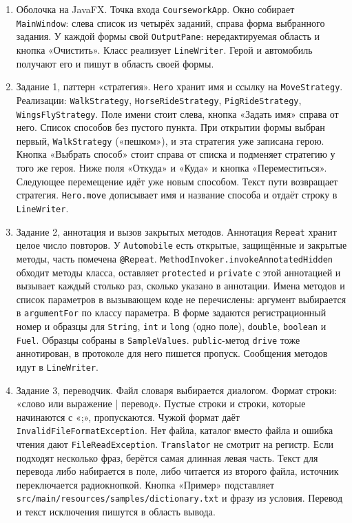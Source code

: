 \documentclass[a4paper,14pt]{extarticle}
\begin{document}
\begin{enumerate}
    \item Оболочка на JavaFX. Точка входа \texttt{CourseworkApp}. Окно собирает \texttt{MainWindow}: слева список из четырёх заданий, справа форма выбранного задания. У каждой формы свой \texttt{OutputPane}: нередактируемая область и кнопка «Очистить». Класс реализует \texttt{LineWriter}. Герой и автомобиль получают его и пишут в область своей формы.

    \item Задание 1, паттерн «стратегия». \texttt{Hero} хранит имя и ссылку на \texttt{MoveStrategy}. Реализации: \texttt{WalkStrategy}, \texttt{HorseRideStrategy}, \texttt{PigRideStrategy}, \texttt{WingsFlyStrategy}. Поле имени стоит слева, кнопка «Задать имя» справа от него. Список способов без пустого пункта. При открытии формы выбран первый, \texttt{WalkStrategy} («пешком»), и эта стратегия уже записана герою. Кнопка «Выбрать способ» стоит справа от списка и подменяет стратегию у того же героя. Ниже поля «Откуда» и «Куда» и кнопка «Переместиться». Следующее перемещение идёт уже новым способом. Текст пути возвращает стратегия. \texttt{Hero.move} дописывает имя и название способа и отдаёт строку в \texttt{LineWriter}.

    \item Задание 2, аннотация и вызов закрытых методов. Аннотация \texttt{Repeat} хранит целое число повторов. У \texttt{Automobile} есть открытые, защищённые и закрытые методы, часть помечена \texttt{@Repeat}. \texttt{MethodInvoker.invokeAnnotatedHidden} обходит методы класса, оставляет \texttt{protected} и \texttt{private} с этой аннотацией и вызывает каждый столько раз, сколько указано в аннотации. Имена методов и список параметров в вызывающем коде не перечислены: аргумент выбирается в \texttt{argumentFor} по классу параметра. В форме задаются регистрационный номер и образцы для \texttt{String}, \texttt{int} и \texttt{long} (одно поле), \texttt{double}, \texttt{boolean} и \texttt{Fuel}. Образцы собраны в \texttt{SampleValues}. \texttt{public}-метод \texttt{drive} тоже аннотирован, в протоколе для него пишется пропуск. Сообщения методов идут в \texttt{LineWriter}.

    \item Задание 3, переводчик. Файл словаря выбирается диалогом. Формат строки: «слово или выражение | перевод». Пустые строки и строки, которые начинаются с «;», пропускаются. Чужой формат даёт \texttt{InvalidFileFormatException}. Нет файла, каталог вместо файла и ошибка чтения дают \texttt{FileReadException}. \texttt{Translator} не смотрит на регистр. Если подходят несколько фраз, берётся самая длинная левая часть. Текст для перевода либо набирается в поле, либо читается из второго файла, источник переключается радиокнопкой. Кнопка «Пример» подставляет \texttt{src/main/resources/samples/dictionary.txt} и фразу из условия. Перевод и текст исключения пишутся в область вывода.


\end{enumerate}
\end{document}
